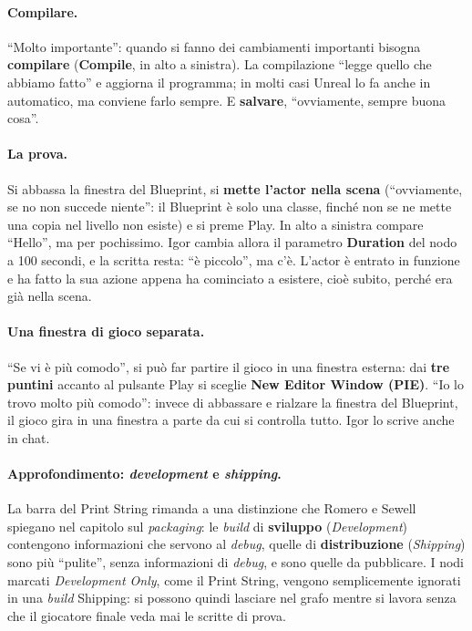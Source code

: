 \paragraph{Compilare.} ``Molto importante'': quando si fanno dei cambiamenti
importanti bisogna \textbf{compilare} (\textbf{Compile}, in alto a sinistra). La
compilazione ``legge quello che abbiamo fatto'' e aggiorna il programma; in molti casi
Unreal lo fa anche in automatico, ma conviene farlo sempre. E \textbf{salvare},
``ovviamente, sempre buona cosa''.

\paragraph{La prova.} Si abbassa la finestra del Blueprint, si \textbf{mette l'actor
nella scena} (``ovviamente, se no non succede niente'': il Blueprint è solo una classe,
finché non se ne mette una copia nel livello non esiste) e si preme Play. In alto a
sinistra compare ``Hello'', ma per pochissimo. Igor cambia allora il parametro
\textbf{Duration} del nodo a 100 secondi, e la scritta resta: ``è piccolo'', ma c'è.
L'actor è entrato in funzione e ha fatto la sua azione appena ha cominciato a esistere,
cioè subito, perché era già nella scena.

\paragraph{Una finestra di gioco separata.} ``Se vi è più comodo'', si può far partire il
gioco in una finestra esterna: dai \textbf{tre puntini} accanto al pulsante Play si
sceglie \textbf{New Editor Window (PIE)}. ``Io lo trovo molto più comodo'': invece di
abbassare e rialzare la finestra del Blueprint, il gioco gira in una finestra a parte da
cui si controlla tutto. Igor lo scrive anche in chat.

\paragraph{Approfondimento: \emph{development} e \emph{shipping}.} La barra del Print
String rimanda a una distinzione che Romero e Sewell spiegano nel capitolo sul
\emph{packaging}: le \emph{build} di \textbf{sviluppo} (\emph{Development}) contengono
informazioni che servono al \emph{debug}, quelle di \textbf{distribuzione}
(\emph{Shipping}) sono più ``pulite'', senza informazioni di \emph{debug}, e sono quelle
da pubblicare. I nodi marcati \emph{Development Only}, come il Print String, vengono
semplicemente ignorati in una \emph{build} Shipping: si possono quindi lasciare nel
grafo mentre si lavora senza che il giocatore finale veda mai le scritte di prova.

